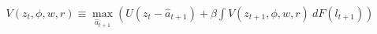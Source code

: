 \begin{align}
V(z_t,\phi,w,r) \equiv \underset{\hat{a}_{t+1}}{\max}\left(U(z_t-\hat{a}_{t+1})+\beta \int V(z_{t+1},\phi,w,r)\ dF(l_{t+1})  \right)
\end{align}
